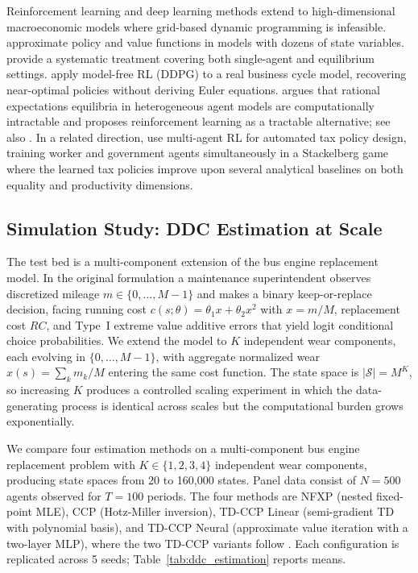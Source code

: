 Reinforcement learning and deep learning methods extend to high-dimensional macroeconomic models where grid-based dynamic programming is infeasible. \citet{MaliarMaliarWinant2021} approximate policy and value functions in models with dozens of state variables. \citet{FernandezVillaverdeNunoPerla2024} provide a systematic treatment covering both single-agent and equilibrium settings. \citet{AtashbarShi2023} apply model-free RL (DDPG) to a real business cycle model, recovering near-optimal policies without deriving Euler equations. \citet{Moll2025} argues that rational expectations equilibria in heterogeneous agent models are computationally intractable and proposes reinforcement learning as a tractable alternative; see also \citet{Zhao2025}. In a related direction, \citet{Zheng2021} use multi-agent RL for automated tax policy design, training worker and government agents simultaneously in a Stackelberg game where the learned tax policies improve upon several analytical baselines on both equality and productivity dimensions.


\subsection{Simulation Study: DDC Estimation at Scale}
\label{sec:ddc_estimation_sim}

The test bed is a multi-component extension of the \citet{Rust1987} bus engine replacement model. In the original formulation a maintenance superintendent observes discretized mileage $m\in\{0,\ldots,M{-}1\}$ and makes a binary keep-or-replace decision, facing running cost $c(s;\theta)=\theta_1 x+\theta_2 x^2$ with $x=m/M$, replacement cost $RC$, and Type~I extreme value additive errors that yield logit conditional choice probabilities. We extend the model to $K$ independent wear components, each evolving in $\{0,\ldots,M{-}1\}$, with aggregate normalized wear $x(s)=\sum_k m_k/M$ entering the same cost function. The state space is $|\mathcal{S}|=M^K$, so increasing $K$ produces a controlled scaling experiment in which the data-generating process is identical across scales but the computational burden grows exponentially.

We compare four estimation methods on a multi-component bus engine replacement problem \citep{Rust1987} with $K \in \{1,2,3,4\}$ independent wear components, producing state spaces from 20 to 160,000 states. Panel data consist of $N=500$ agents observed for $T=100$ periods. The four methods are NFXP (nested fixed-point MLE), CCP (Hotz-Miller inversion), TD-CCP Linear (semi-gradient TD with polynomial basis), and TD-CCP Neural (approximate value iteration with a two-layer MLP), where the two TD-CCP variants follow \citet{AdusumilliEckardt2022}. Each configuration is replicated across 5 seeds; Table~\ref{tab:ddc_estimation} reports means.

